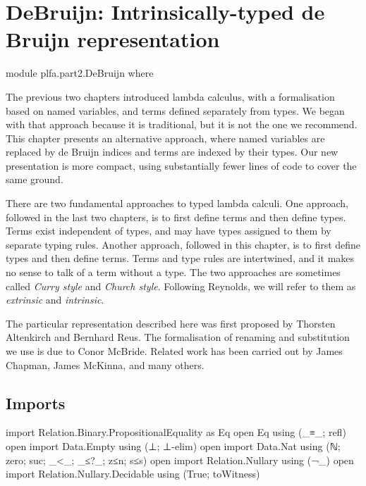 \hypertarget{DeBruijn}{%
\chapter{DeBruijn: Intrinsically-typed de Bruijn
representation}\label{DeBruijn}}

\begin{fence}
\begin{code}
module plfa.part2.DeBruijn where
\end{code}
\end{fence}

The previous two chapters introduced lambda calculus, with a
formalisation based on named variables, and terms defined separately
from types. We began with that approach because it is traditional, but
it is not the one we recommend. This chapter presents an alternative
approach, where named variables are replaced by de Bruijn indices and
terms are indexed by their types. Our new presentation is more compact,
using substantially fewer lines of code to cover the same ground.

There are two fundamental approaches to typed lambda calculi. One
approach, followed in the last two chapters, is to first define terms
and then define types. Terms exist independent of types, and may have
types assigned to them by separate typing rules. Another approach,
followed in this chapter, is to first define types and then define
terms. Terms and type rules are intertwined, and it makes no sense to
talk of a term without a type. The two approaches are sometimes called
\emph{Curry style} and \emph{Church style}. Following Reynolds, we will
refer to them as \emph{extrinsic} and \emph{intrinsic}.

The particular representation described here was first proposed by
Thorsten Altenkirch and Bernhard Reus. The formalisation of renaming and
substitution we use is due to Conor McBride. Related work has been
carried out by James Chapman, James McKinna, and many others.

\hypertarget{imports}{%
\section{Imports}\label{imports}}

\begin{fence}
\begin{code}
import Relation.Binary.PropositionalEquality as Eq
open Eq using (_≡_; refl)
open import Data.Empty using (⊥; ⊥-elim)
open import Data.Nat using (ℕ; zero; suc; _<_; _≤?_; z≤n; s≤s)
open import Relation.Nullary using (¬_)
open import Relation.Nullary.Decidable using (True; toWitness)
\end{code}
\end{fence}

